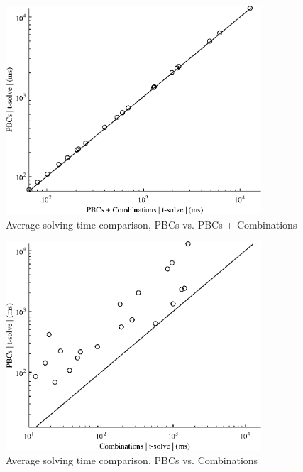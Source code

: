 {\begin{figure}
    \centering
    \includegraphics[width = 0.85\textwidth]{Figures/opt_solve_2_1.eps}
    \caption{Average solving time comparison, PBCs vs. PBCs + Combinations}
    \label{opt_solve_2_1}
\end{figure}

\begin{figure}
    \centering
    \includegraphics[width = 0.85\textwidth]{Figures/opt_solve_3_1.eps}
    \caption{Average solving time comparison, PBCs vs. Combinations}
    \label{opt_solve_3_1}
\end{figure}
}
\FloatBarrier


